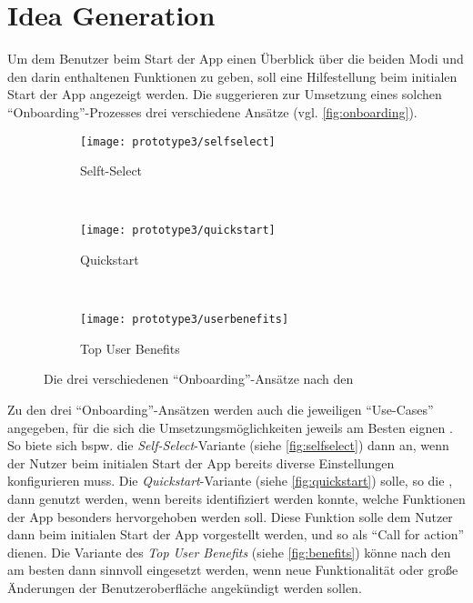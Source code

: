 \section{Idea Generation}\label{sec:idea3}
Um dem Benutzer beim Start der App einen Überblick über die beiden Modi und den darin enthaltenen Funktionen zu geben, soll eine Hilfestellung beim initialen Start der App angezeigt werden.
Die \mg{} suggerieren zur Umsetzung eines solchen ``Onboarding''-Prozesses drei verschiedene Ansätze (vgl. \autoref{fig:onboarding}). \\

\begin{figure}[h]
  \begin{subfigure}[t]{0.3\textwidth}
    \centering
    \texttt{[image: prototype3/selfselect]}
    \caption{Selft-Select}
    \label{fig:selfselect}
  \end{subfigure}
  ~
  \begin{subfigure}[t]{0.3\textwidth}
    \centering
    \texttt{[image: prototype3/quickstart]}
    \caption{Quickstart}
    \label{fig:quickstart}
  \end{subfigure}
  ~
  \begin{subfigure}[t]{0.3\textwidth}
    \centering
    \texttt{[image: prototype3/userbenefits]}
    \caption{Top User Benefits}
    \label{fig:benefits}
  \end{subfigure}
  \centering
  \caption{Die drei verschiedenen ``Onboarding''-Ansätze nach den \mg{}}
  \label{fig:onboarding}
\end{figure}

Zu den drei ``Onboarding''-Ansätzen werden auch die jeweiligen ``Use-Cases'' angegeben, für die sich die Umsetzungsmöglichkeiten jeweils am Besten eignen \citep[Abschnitt ``Usage'']{Onboarding}.
So biete sich bspw. die \emph{Self-Select}-Variante (siehe \autoref{fig:selfselect}) dann an, wenn der Nutzer beim initialen Start der App bereits diverse Einstellungen konfigurieren muss.
Die \emph{Quickstart}-Variante (siehe \autoref{fig:quickstart}) solle, so die \mg{}, dann genutzt werden, wenn bereits identifiziert werden konnte, welche Funktionen der App besonders hervorgehoben werden soll.
Diese Funktion solle dem Nutzer dann beim initialen Start der App vorgestellt werden, und so als ``Call for action'' dienen.
Die Variante des \emph{Top User Benefits} (siehe \autoref{fig:benefits}) könne nach den \mg{} am besten dann sinnvoll eingesetzt werden, wenn neue Funktionalität oder große Änderungen der Benutzeroberfläche angekündigt werden sollen. \\

